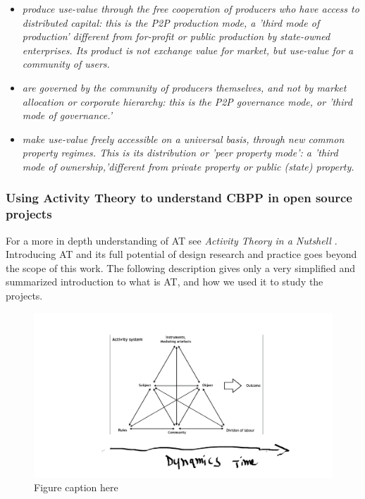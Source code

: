 \documentclass{ICED-Paper}%
\begin{document}
\begin{itemize}
  \item \emph{produce use-value through the free cooperation of producers who have access to distributed capital: this is the P2P production mode, a 'third mode of production' different from for-profit or public production by state-owned enterprises. Its product is not exchange value for market, but use-value for a community of users.}
  \item \emph{are governed by the community of producers themselves, and not by market allocation or corporate hierarchy: this is the P2P governance mode, or 'third mode of governance.'}
  \item \emph{make use-value freely accessible on a universal basis, through new common property regimes. This is its distribution or 'peer property mode': a 'third mode of ownership,'different from private property or public (state) property.}
\end{itemize}

\subsubsection{Using Activity Theory to understand CBPP in open source projects}
For a more in depth understanding of AT see \emph{Activity Theory in a Nutshell} \cite{ATnuthsell}. Introducing AT and its full potential of design research and practice goes beyond the scope of this work. The following description gives only a very simplified and summarized introduction to what is AT, and how we used it to study the projects.

\begin{figure}
\includegraphics[width=\linewidth,height=\textheight,keepaspectratio]{Activity System.png}
\caption{Figure caption here\label{fig1}}
\end{figure}
\end{document}
